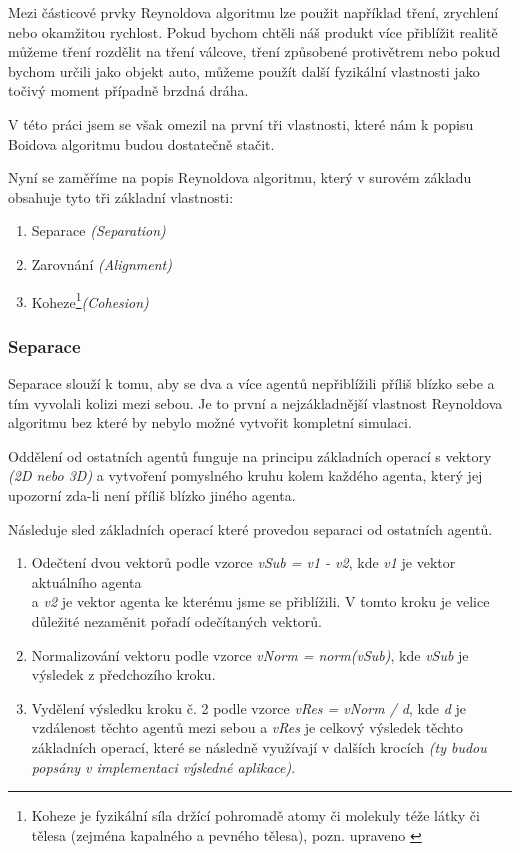\documentclass[czech,public,dept460,male,cpdeclaration]{diploma}
\begin{document}
Mezi částicové prvky Reynoldova algoritmu lze použit například tření, zrychlení nebo okamžitou rychlost. Pokud bychom chtěli náš produkt více přiblížit realitě můžeme tření rozdělit na tření válcove, tření způsobené protivětrem nebo pokud bychom určili jako objekt auto, můžeme použít další fyzikální vlastnosti jako točivý moment případně brzdná dráha.

V této práci jsem se však omezil na první tři vlastnosti, které nám k popisu Boidova algoritmu budou dostatečně stačit.

\newpage
Nyní se zaměříme na popis Reynoldova algoritmu, který v surovém základu obsahuje tyto tři základní vlastnosti:

\begin{enumerate}
	\item Separace \textit{(Separation)}
	\item Zarovnání \textit{(Alignment)}
	\item Koheze\footnote{Koheze je fyzikální síla držící pohromadě atomy či molekuly téže látky či tělesa (zejména
		kapalného a pevného tělesa), pozn. upraveno \cite{linkToCohesion}}\textit{(Cohesion)}
\end{enumerate}

\subsubsection{Separace}
Separace slouží k tomu, aby se dva a více agentů nepřiblížili příliš blízko sebe a tím vyvolali kolizi mezi sebou. Je to první a nejzákladnější vlastnost Reynoldova algoritmu bez které by nebylo možné vytvořit kompletní simulaci. 

Oddělení od ostatních agentů funguje na principu základních operací s vektory \textit{(2D nebo 3D)} a vytvoření pomyslného kruhu kolem každého agenta, který jej upozorní zda-li není příliš blízko jiného agenta. 

Následuje sled základních operací které provedou separaci od ostatních agentů. 

\begin{enumerate}
	\item Odečtení dvou vektorů podle vzorce \textit{vSub = v1 - v2}, kde \textit{v1} je vektor aktuálního agenta\\ a \textit{v2} je vektor agenta ke kterému jsme se přiblížili. V tomto kroku je velice důležité nezaměnit pořadí odečítaných vektorů.
	\item Normalizování vektoru podle vzorce \textit{vNorm = norm(vSub)}, kde \textit{vSub} je výsledek z předchozího kroku.
	\item Vydělení výsledku kroku č. 2 podle vzorce \textit{vRes = vNorm / d}, kde \textit{d} je vzdálenost těchto agentů mezi sebou a \textit{vRes} je celkový výsledek těchto základních operací, které se následně využívají v dalších krocích \textit{(ty budou popsány v implementaci výsledné aplikace)}.
\end{enumerate}
\end{document}
